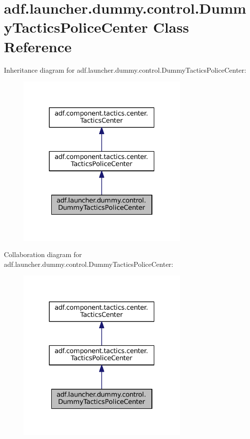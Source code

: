 \hypertarget{classadf_1_1launcher_1_1dummy_1_1control_1_1DummyTacticsPoliceCenter}{}\section{adf.\+launcher.\+dummy.\+control.\+Dummy\+Tactics\+Police\+Center Class Reference}
\label{classadf_1_1launcher_1_1dummy_1_1control_1_1DummyTacticsPoliceCenter}


Inheritance diagram for adf.\+launcher.\+dummy.\+control.\+Dummy\+Tactics\+Police\+Center\+:
\nopagebreak
\begin{figure}[H]
\begin{center}
\leavevmode
\includegraphics[width=241pt]{classadf_1_1launcher_1_1dummy_1_1control_1_1DummyTacticsPoliceCenter__inherit__graph}
\end{center}
\end{figure}


Collaboration diagram for adf.\+launcher.\+dummy.\+control.\+Dummy\+Tactics\+Police\+Center\+:
\nopagebreak
\begin{figure}[H]
\begin{center}
\leavevmode
\includegraphics[width=241pt]{classadf_1_1launcher_1_1dummy_1_1control_1_1DummyTacticsPoliceCenter__coll__graph}
\end{center}
\end{figure}
